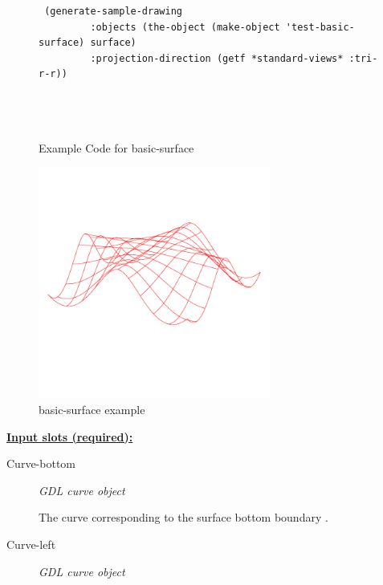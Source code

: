 \documentclass [11pt]{book}
\begin{document}
\begin{itemize}
\begin{figure}
\begin{lrbox}{\boxedverb}
\begin{minipage}{\linewidth}
{\begin{verbatim}
 (generate-sample-drawing 
	     :objects (the-object (make-object 'test-basic-surface) surface)
	     :projection-direction (getf *standard-views* :tri-r-r))


 
\end{verbatim}}
\end{minipage}
\end{lrbox}
\fbox{\usebox{\boxedverb}}

\caption{Example Code for basic-surface}

\label{fig:example-code-basic-surface}

\end{figure}

\begin{figure}
\begin{center}
\includegraphics[width=3in,height=3in]{../images/example-basic-surface.pdf}
\end{center}

\caption{basic-surface example}

\label{fig:basic-surface}

\end{figure}





\textbf{
\underline{Input slots (required):}}

\begin{description}

\item [Curve-bottom]
\emph{GDL curve object}

 The curve corresponding to the surface bottom boundary .




\item [Curve-left]
\emph{GDL curve object}


\end{description}
\end{itemize}
\end{document}
